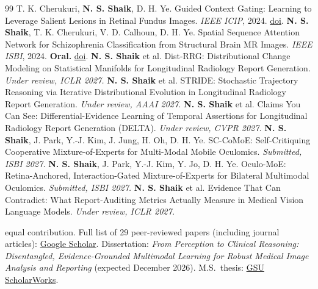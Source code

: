 \documentclass[10pt,letterpaper]{article}
\begin{document}
\begin{thebibliography}{99}
 T. K. Cherukuri, \textbf{N. S. Shaik}, D. H. Ye. Guided Context Gating: Learning to Leverage Salient Lesions in Retinal Fundus Images. \textit{IEEE ICIP}, 2024. \href{https://doi.org/10.1109/ICIP51287.2024.10647604}{doi}.
 \textbf{N. S. Shaik}, T. K. Cherukuri, V. D. Calhoun, D. H. Ye. Spatial Sequence Attention Network for Schizophrenia Classification from Structural Brain MR Images. \textit{IEEE ISBI}, 2024. \textbf{Oral.} \href{https://doi.org/10.1109/ISBI56570.2024.10635528}{doi}.
 \textbf{N. S. Shaik} et al. Dist-RRG: Distributional Change Modeling on Statistical Manifolds for Longitudinal Radiology Report Generation. \textit{Under review, ICLR 2027.}
 \textbf{N. S. Shaik} et al. STRIDE: Stochastic Trajectory Reasoning via Iterative Distributional Evolution in Longitudinal Radiology Report Generation. \textit{Under review, AAAI 2027.}
 \textbf{N. S. Shaik} et al. Claims You Can See: Differential-Evidence Learning of Temporal Assertions for Longitudinal Radiology Report Generation (DELTA). \textit{Under review, CVPR 2027.}
 \textbf{N. S. Shaik}, J. Park, Y.-J. Kim, J. Jung, H. Oh, D. H. Ye. SC-CoMoE: Self-Critiquing Cooperative Mixture-of-Experts for Multi-Modal Mobile Oculomics. \textit{Submitted, ISBI 2027.}
 \textbf{N. S. Shaik}, J. Park, Y.-J. Kim, Y. Jo, D. H. Ye. Oculo-MoE: Retina-Anchored, Interaction-Gated Mixture-of-Experts for Bilateral Multimodal Oculomics. \textit{Submitted, ISBI 2027.}
 \textbf{N. S. Shaik} et al. Evidence That Can Contradict: What Report-Auditing Metrics Actually Measure in Medical Vision Language Models. \textit{Under review, ICLR 2027.}
\end{thebibliography}
\vspace{2pt}
{\footnotesize * equal contribution. Full list of 29 peer-reviewed papers (including journal articles): \href{https://scholar.google.com/citations?user=rkfPEjUAAAAJ}{Google Scholar}. Dissertation: \emph{From Perception to Clinical Reasoning: Disentangled, Evidence-Grounded Multimodal Learning for Robust Medical Image Analysis and Reporting} (expected December 2026). M.S.\ thesis: \href{https://hdl.handle.net/20.500.14694/15456}{GSU ScholarWorks}.}
\end{document}
